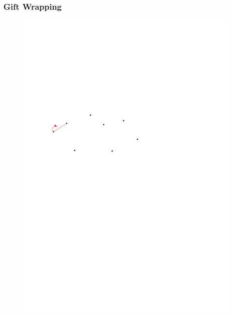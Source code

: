 \begin{frame}
	\frametitle{{Gift Wrapping}}
\begin{figure}[htbp]
	\begin{center}
  	\includegraphics[width=.8\linewidth]{bilder/giftwrap1}
	\end{center}
\end{figure}
\end{frame}


